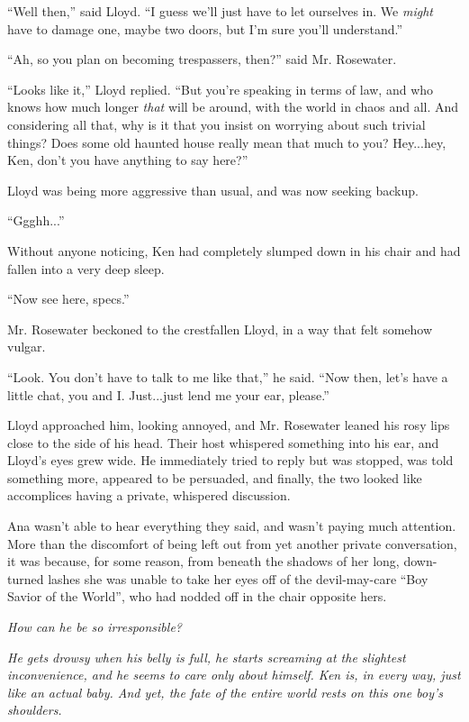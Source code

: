 \documentclass[
]{article}
\begin{document}
``Well then,'' said Lloyd. ``I guess we'll just have to let ourselves
in. We \emph{might} have to damage one, maybe two doors, but I'm sure
you'll understand.''

``Ah, so you plan on becoming trespassers, then?'' said Mr. Rosewater.

``Looks like it,'' Lloyd replied. ``But you're speaking in terms of law,
and who knows how much longer \emph{that} will be around, with the world
in chaos and all. And considering all that, why is it that you insist on
worrying about such trivial things? Does some old haunted house really
mean that much to you? Hey...hey, Ken, don't you have anything to say
here?''

Lloyd was being more aggressive than usual, and was now seeking backup.

``Ggghh...''

Without anyone noticing, Ken had completely slumped down in his chair
and had fallen into a very deep sleep.

``Now see here, specs.''

Mr. Rosewater beckoned to the crestfallen Lloyd, in a way that felt
somehow vulgar.

``Look. You don't have to talk to me like that,'' he said. ``Now then,
let's have a little chat, you and I. Just...just lend me your ear,
please.''

Lloyd approached him, looking annoyed, and Mr. Rosewater leaned his rosy
lips close to the side of his head. Their host whispered something into
his ear, and Lloyd's eyes grew wide. He immediately tried to reply but
was stopped, was told something more, appeared to be persuaded, and
finally, the two looked like accomplices having a private, whispered
discussion.

Ana wasn't able to hear everything they said, and wasn't paying much
attention. More than the discomfort of being left out from yet another
private conversation, it was because, for some reason, from beneath the
shadows of her long, down-turned lashes she was unable to take her eyes
off of the devil-may-care ``Boy Savior of the World'', who had nodded
off in the chair opposite hers.

\emph{How can he be so irresponsible?}

\emph{He gets drowsy when his belly is full, he starts screaming at the
slightest inconvenience, and he seems to care only about himself. Ken
is, in every way, just like an actual baby. And yet, the fate of the
entire world rests on this one boy's shoulders.}
\end{document}
